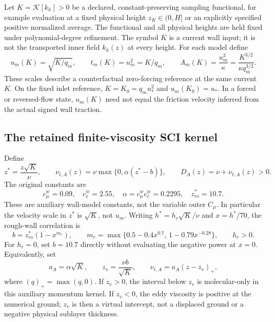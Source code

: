 \documentclass[11pt,a4paper]{article}
\numberwithin{equation}{section}
\newcommand{\ust}{u_*}
\begin{document}
Let $K=\mathcal K[k_h]>0$ be a declared, constant-preserving sampling
functional, for example evaluation at a fixed physical height
$z_K\in(0,H]$ or an explicitly specified positive normalized average.
The functional and all physical heights are held fixed under
polynomial-degree refinement. The symbol $K$ is a current wall input;
it is not the transported inner field $k_h(z)$ at every height.
For each model define
\begin{equation}
 \boxed{
 u_m(K)=\sqrt{K/q_m},\qquad
 t_m(K)=u_m^2=K/q_m,\qquad
 A_m(K)=\frac{u_m^3}{\kappa}
       =\frac{K^{3/2}}{\kappa q_m^{3/2}}.
 }
 \label{awf:reference-scales}
\end{equation}
These scales describe a counterfactual zero-forcing reference at the
same current $K$. On the fixed inlet reference,
$K=K_0=q_m\ust^2$ and $u_m(K_0)=\ust$. In a forced or reversed-flow
state, $u_m(K)$ need not equal the friction velocity inferred from the
actual signed wall traction.

\subsection{The retained finite-viscosity SCI kernel}
\label{awf:kernel}

Define
\begin{equation}
 \boxed{
 z^*=\frac{z\sqrt K}{\nu},\qquad
 \nu_{t,A}(z)=\nu\max\{0,\alpha(z^*-b)\},\qquad
 D_A(z)=\nu+\nu_{t,A}(z)>0.
 }
 \label{awf:selected-viscosity}
\end{equation}
The original constants are
\begin{equation}
 c_\mu^w=0.09,\quad c_\ell^w=2.55,\quad
 \alpha=c_\mu^wc_\ell^w=0.2295,\quad z_{vs}^*=10.7.
 \label{awf:original-constants}
\end{equation}
These are auxiliary wall-model constants, not the variable outer
$C_\mu$. In particular the velocity scale in $z^*$ is $\sqrt K$,
not $u_m$.
Writing $h^*=h_r\sqrt K/\nu$ and $x=h^*/70$, the rough-wall
correlation is
\begin{equation}
 b=z_{vs}^*(1-x^{m_r}),\qquad
 m_r=\max\{0.5-0.4x^{0.7},\,1-0.79x^{-0.28}\},\qquad h_r>0.
 \label{awf:original-intercept}
\end{equation}
For $h_r=0$, set $b=10.7$ directly without evaluating the negative
power at $x=0$. Equivalently, set
\begin{equation}
 a_A=\alpha\sqrt K,\qquad z_v=\frac{\nu b}{\sqrt K},\qquad
 \nu_{t,A}=a_A(z-z_v)_+,
 \label{awf:dimensional-kernel}
\end{equation}
where $(q)_+=\max(q,0)$. If $z_v>0$, the interval below $z_v$
is molecular-only in this auxiliary momentum kernel. If $z_v<0$,
the eddy viscosity is positive at the numerical ground; $z_v$ is
then a virtual intercept, not a displaced ground or a negative
physical sublayer thickness.
\end{document}
